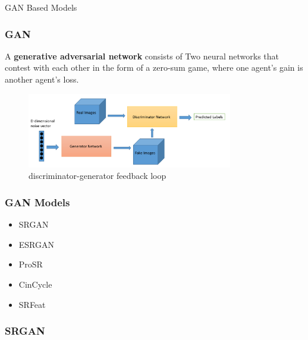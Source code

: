 \documentclass[11pt, presentation]{beamer}
\begin{document}
    \begin{section}{GAN Based Models}
        \begin{frame}
            \frametitle{GAN}
            A \textbf{generative adversarial network} consists of Two neural networks
            that contest with each other in the form of a zero-sum game, where one agent's gain is another agent's loss.
            \begin{figure}
                \includegraphics[width=0.8\textwidth]{images/gan_schema}
                \caption{discriminator-generator feedback loop~\cite{pmgan}}
                \label{fig:gan-schema}
            \end{figure}
        \end{frame}
        \begin{frame}[label=gan-list]
            \frametitle{GAN Models}
            \begin{itemize}
                \item SRGAN
                \item ESRGAN
                \item ProSR
                \item CinCycle
                \item SRFeat
            \end{itemize}
        \end{frame}
        \begin{frame}
            \frametitle{SRGAN}
\end{frame}
\end{section}
\end{document}
